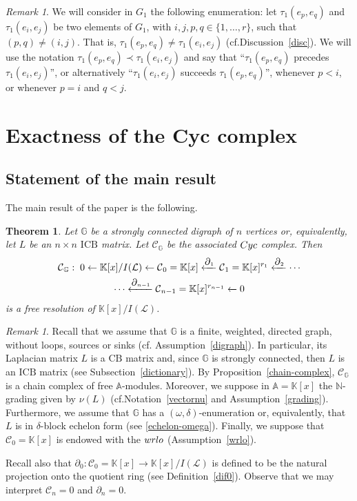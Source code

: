 \documentclass[10pt]{amsart}
\newcommand{\cf}{cf.}
\newcommand{\mbn}{\mbox{$\mathbb{N}$}}
\newcommand{\mbk}{\mbox{$\mathbb{K}$}}
\newcommand{\mba}{\mbox{$\mathbb{A}$}}
\newcommand{\mbg}{\mbox{$\mathbb{G}$}}
\newcommand{\mcc}{\mbox{$\mathcal{C}$}}
\newcommand{\mcl}{\mbox{$\mathcal{L}$}}
\newcommand{\icb}{\mbox{$\mathrm{ICB}$}}
\newcommand{\cb}{\mbox{$\mathrm{CB}$}}
\newcommand{\dif}{\mbox{$\partial$}}
\newcommand{\sdif}{\mbox{\tiny $\partial$}}
\newcommand{\cyc}{\mbox{${\rm Cyc}$}}
\newcommand{\wrlo}{\mbox{${\rm wrlo}$}}
\newtheorem{theorem}[cdrthm]{Theorem}
\theoremstyle{definition}
\theoremstyle{remark}
\newtheorem{remark}[cdrthm]{Remark}
\begin{document}
\begin{remark}\label{induced-srle}
We will consider in $G_1$ the following enumeration: let
$\tau_1(e_p,e_q)$ and $\tau_1(e_i,e_j)$ be two elements of $G_1$, with
$i,j,p,q\in\{1,\ldots ,r\}$, such that $(p,q)\neq (i,j)$. That is,
$\tau_1(e_p,e_q)\neq\tau_1(e_i,e_j)$ (\cf Discussion~\ref{disc}).  We
will use the notation $\tau_1(e_p,e_q)\prec \tau_1(e_i,e_j)$ and say
that ``$\tau_1(e_p,e_q)$ precedes $\tau_1(e_i,e_j)$'', or
alternatively ``$\tau_1(e_i,e_j)$ succeeds $\tau_1(e_p,e_q)$'',
whenever $p<i$, or whenever $p=i$ and $q<j$.
\end{remark}

\section{Exactness of the Cyc complex}

\subsection{Statement of the main result}

The main result of the paper is the following.
\begin{theorem}\label{main}
Let $\mbg$ be a strongly connected digraph of $n$ vertices or,
equivalently, let $L$ be an $n\times n$ $\icb$ matrix. Let
$\mcc_{\mathbb{G}}$ be the associated $\cyc$ complex. Then
\begin{multline*}
\mcc_{\mathbb{G}}:\; 0\leftarrow \mbk[x]/I(\mcl)\leftarrow
\mcc_0=\mbk[x]\xleftarrow{\sdif_1} \mcc_1=\mbk[x]^{r_1}
\xleftarrow{\sdif_2} \cdots \\ \cdots
\xleftarrow{\sdif_{n-1}}\mcc_{n-1}=\mbk[x]^{r_{n-1}}\xleftarrow{} 0
\end{multline*}
is a free resolution of $\mbk[x]/I(\mcl)$.
\end{theorem}

\begin{remark}
Recall that we assume that $\mbg$ is a finite, weighted, directed
graph, without loops, sources or sinks (\cf
Assumption~\ref{digraph}). In particular, its Laplacian matrix $L$ is
a $\cb$ matrix and, since $\mbg$ is strongly connected, then $L$ is an
$\icb$ matrix (see Subsection~\ref{dictionary}). By
Proposition~\ref{chain-complex}, $\mcc_{\mathbb{G}}$ is a chain
complex of free $\mba$-modules. Moreover, we suppose in $\mba=\mbk[x]$
the $\mbn$-grading given by $\nu(L)$ (\cf Notation~\ref{vectornu} and
Assumption~\ref{grading}). Furthermore, we assume that $\mbg$ has a
$(\omega,\delta)$-enumeration or, equivalently, that $L$ is in
$\delta$-block echelon form (see \ref{echelon-omega}). Finally, we
suppose that $\mcc_0=\mbk[x]$ is endowed with the $\wrlo$
(Assumption~\ref{wrlo}).

Recall also that $\dif_0:\mcc_0=\mbk[x]\to \mbk[x]/I(\mcl)$ is defined
to be the natural projection onto the quotient ring (see
Definition~\ref{dif0}). Observe that we may interpret $\mcc_n=0$ and
$\dif_n=0$.
\end{remark}
\end{document}
